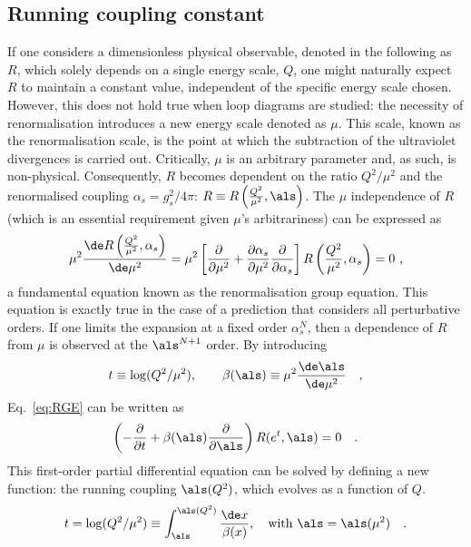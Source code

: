 \subsection{Running coupling constant}
If one considers a dimensionless physical observable, denoted in the following as $R$, which solely depends on a single energy scale, $Q$, one might naturally expect $R$ to maintain a constant value, independent of the specific energy scale chosen. However, this does not hold true when loop diagrams are studied: the necessity of renormalisation introduces a new energy scale denoted as $\mu$. This scale, known as the renormalisation scale, is the point at which the subtraction of the ultraviolet divergences is carried out. Critically, $\mu$ is an arbitrary parameter and, as such, is non-physical. Consequently, $R$ becomes dependent on the ratio $Q^2/\mu^2$ and the renormalised coupling $\alpha_s = g_s^2/4\pi$: $R \equiv R\left(\frac{Q^2}{\mu^2},\als\right)$. The $\mu$ independence of $R$ (which is an essential requirement given $\mu$'s arbitrariness) can be expressed as
\begin{equation}\label{eq:RGE}
    \mu^2 \frac{\de R\left(\frac{Q^2}{\mu^2},\alpha_s\right)}{\de \mu^2} = \mu^2 \left[\frac{\partial}{\partial\mu^2}+\frac{\partial \alpha_s}{\partial\mu^2}\frac{\partial}{\partial\alpha_s}\right]R\left(\frac{Q^2}{\mu^2},\alpha_s\right) = 0\ , 
\end{equation}
a fundamental equation known as the renormalisation group equation. This equation is exactly true in the case of a prediction that considers all perturbative orders. If one limits the expansion at a fixed order $\alpha_s^N$, then a dependence of $R$ from $\mu$ is observed at the $\als^{N+1}$ order. By introducing
\begin{equation*}
    t\equiv \mathrm{log}(Q^2/\mu^2), \qquad \beta(\als)\equiv \mu^2 \frac{\de\als}{\mathrm{\de\mu^2}}\quad ,
\end{equation*}
Eq.~\ref{eq:RGE} can be written as
\begin{equation*}
    \left(-\frac{\partial}{\partial t} + \beta(\als)\frac{\partial}{\partial \als}\right) R(e^t,\als) = 0\quad .
\end{equation*}
This first-order partial differential equation can be solved by defining a new function: the running coupling $\als(Q^2)$, which evolves as a function of $Q$.
\begin{equation}\label{eq:t_integral}
    t = \mathrm{log}(Q^2/\mu^2) \equiv \int_{\als}^{\als(Q^2)} \frac{\de x}{\beta(x)} , \quad \mathrm{with}~\als=\als(\mu^2)\quad .
\end{equation}
